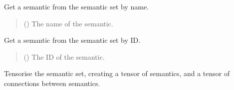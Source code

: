\documentclass[letterpaper,10pt,english]{sphinxmanual}
\begin{document}
\begin{fulllineitems}
\begin{fulllineitems}
\begin{quote}
\begin{description}
\end{description}\end{quote}

\end{fulllineitems}


\begin{fulllineitems}
\label{\detokenize{nodes:nodes.nodeBuilder.Sem_set.get_sem}}
\pysigstartsignatures
\pysiglinewithargsret
{}
{}
{}
\pysigstopsignatures
\sphinxAtStartPar
Get a semantic from the semantic set by name.
\begin{quote}\begin{description}
\sphinxAtStartPar
{} () \textendash{} The name of the semantic.

\end{description}\end{quote}

\end{fulllineitems}


\begin{fulllineitems}
\label{\detokenize{nodes:nodes.nodeBuilder.Sem_set.get_sem_by_id}}
\pysigstartsignatures
\pysiglinewithargsret
{}
{}
{}
\pysigstopsignatures
\sphinxAtStartPar
Get a semantic from the semantic set by ID.
\begin{quote}\begin{description}
\sphinxAtStartPar
{} () \textendash{} The ID of the semantic.

\end{description}\end{quote}

\end{fulllineitems}


\begin{fulllineitems}
\label{\detokenize{nodes:nodes.nodeBuilder.Sem_set.tensorise}}
\pysigstartsignatures
\pysiglinewithargsret
{}
{}
{}
\pysigstopsignatures
\sphinxAtStartPar
Tensorise the semantic set, creating a tensor of semantics, and a tensor of connections between semantics.

\end{fulllineitems}


\end{fulllineitems}
\end{document}
